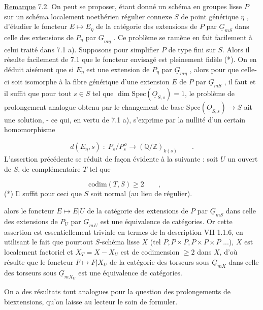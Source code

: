 \underline{Remarque} 7.2. On peut se proposer, étant donné un schéma en groupes lisse $P$ sur un schéma localement noethérien régulier connexe $S$ de point générique $\eta$ , d'étudier le foncteur $E \longmapsto E_\eta$ de la catégorie des extensions de $P$ par $\underline{G}_{mS}$ dans celle des extensions de $P_\eta$ par $\underline{G}_{m\eta}$ . Ce problème se ramène en fait facilement à celui traité dans 7.1 a). Supposons pour simplifier $P$ de type fini sur $S$. Alors il résulte facilement de 7.1 que le foncteur envisagé est pleinement fidèle (*). On en déduit aisément que si $E_\eta$ est une extension de $P_\eta$ par $\underline{G}_{m\eta}$ , alors pour que celle-ci soit isomorphe à la fibre générique d'une extension $E$ de $P$ par $\underline{G}_{mS}$ , il faut et il suffit que pour tout $s \in S$ tel que $\dim \mathrm{Spec}(\underline{O}_{S,s}) = 1$, le problème de prolongement analogue obtenu par le changement de base $\mathrm{Spec}(\underline{O}_{S,s}) \to S$ ait une solution, - ce qui, en vertu de 7.1 a), s'exprime par la nullité d'un certain homomorphisme

\begin{equation}\tag{7.2.1}
d(E_\eta ,s) \; : \; P_s/P_s^{\,o} \longrightarrow (\mathbb{Q}/\mathbb{Z})_{k(s)} \qquad .
\end{equation}
L'assertion précédente se réduit de façon évidente à la suivante : soit $U$ un ouvert de $S$, de complémentaire $T$ tel que

\begin{equation*}
\mathrm{codim}(T,S) \geqslant 2 \qquad , \qquad 
\end{equation*}
(*) Il suffit pour ceci que $S$ soit normal (au lieu de régulier).



 alors le foncteur $E \longmapsto E|U$ de la catégorie des extensions de $P$ par $\underline{G}_{mS}$ dans celle des extensions de $P_U$ par $\underline{G}_{m\,U}$ est une équivalence de catégories. Or cette assertion est essentiellement triviale en termes de la description VII 1.1.6, en utilisant le fait que pourtout $S$-schéma lisse $X$ (tel $P, P\times P, P\times P\times P$ ...), $X$ est localement factoriel et $X_T = X - X_U$ est de codimension $\geqslant 2$ dans $X$, d'où résulte que le foncteur $F \longmapsto F|X_U$ de la catégorie des torseurs sous $\underline{G}_{mX}$ dans celle des torseurs sous $\underline{G}_{mX_U}$ est une équivalence de catégories.

On a des résultats tout analogues pour la question des prolongements de biextensions, qu'on laisse au lecteur le soin de formuler.

